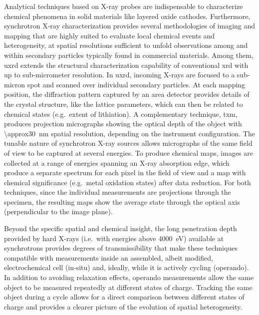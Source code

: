 \documentclass{article}
\begin{document}
Analytical techniques based on X-ray probes are indispensable to
characterize chemical phenomena in solid materials like layered oxide
cathodes\cite{doeff2017}. Furthermore, synchrotron X-ray
characterization provides several methodologies of imaging and mapping
that are highly suited to evaluate local chemical events and
heterogeneity\cite{wolf2017}, at spatial resolutions sufficient to
unfold observations among and within secondary particles typically
found in commercial materials. Among them, \gls{uxrd} extends the
structural characterization capability of conventional \gls{xrd} with
up to sub-micrometer resolution. In \gls{uxrd}, incoming X-rays are
focused to a sub-micron spot and scanned over individual secondary
particles. At each mapping position, the diffraction pattern captured
by an area detector provides details of the crystal structure, like
the lattice parameters, which can then be related to chemical states
(e.g.\ extent of lithiation). A complementary technique, \Gls{txm},
produces projection micrographs showing the optical depth of the
object with \SI{\approx30}{nm} spatial resolution, depending on the
instrument configuration. The tunable nature of synchrotron X-ray
sources allows micrographs of the same field of view to be captured at
several energies. To produce chemical maps, images are collected at a
range of energies spanning an X-ray absorption edge, which produce a
separate spectrum for each pixel in the field of view and a map with
chemical significance (e.g.\ metal oxidation states) after data
reduction. For both techniques, since the individual measurements are
projections through the specimen, the resulting maps show the average
state through the optical axis (perpendicular to the image plane).

Beyond the specific spatial and chemical insight, the long penetration
depth provided by hard X-rays (i.e.\ with energies above
\SI{4000}{\electronvolt}) available at synchrotrons provides degrees
of transmissibility that make these techniques compatible with
measurements inside an assembled, albeit modified, electrochemical
cell (in-situ) and, ideally, while it is actively cycling
(operando). In addition to avoiding relaxation effects, operando
measurements allow the same object to be measured repeatedly at
different states of charge. Tracking the same object during a cycle
allows for a direct comparison between different states of charge and
provides a clearer picture of the evolution of spatial heterogeneity.

\end{document}
